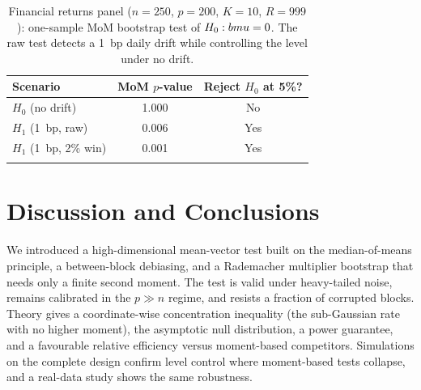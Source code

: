 \documentclass[pdflatex,sn-mathphys-num]{sn-jnl}
\newcommand{\bmu}{\boldsymbol{\mu}}
\theoremstyle{thmstyleone}%
\theoremstyle{thmstyletwo}%
\theoremstyle{thmstylethree}%
\begin{document}
\begin{table}[t]
\centering\small
\caption{Financial returns panel ($n=250$, $p=200$, $K=10$, $R=999$):
one-sample MoM bootstrap test of $H_0:\\bmu=0$.  The raw test detects a
1~bp daily drift while controlling the level under no drift.}
\label{tab:fin}
\begin{tabular}{lcc}
\toprule
Scenario & MoM $p$-value & Reject $H_0$ at 5\%? \\
\midrule
$H_0$ (no drift)  & 1.000 & No \\
$H_1$ (1~bp, raw) & 0.006 & Yes \\
$H_1$ (1~bp, 2\% win) & 0.001 & Yes \\
\botrule
\end{tabular}
\end{table}

\section{Discussion and Conclusions}
\label{sec:disc}

We introduced a high-dimensional mean-vector test built on the median-of-means
principle, a between-block debiasing, and a Rademacher multiplier bootstrap that
needs only a finite second moment. The test is valid under heavy-tailed noise,
remains calibrated in the $p\gg n$ regime, and resists a fraction of corrupted
blocks. Theory gives a coordinate-wise concentration inequality (the
sub-Gaussian rate with no higher moment), the asymptotic null distribution, a
power guarantee, and a favourable relative efficiency versus moment-based
competitors. Simulations on the complete design confirm level control where
moment-based tests collapse, and a real-data study shows the same robustness.
\end{document}
